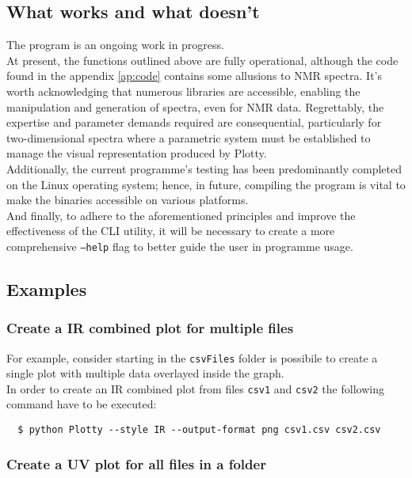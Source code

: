 \documentclass[../Master.tex]{subfiles}
\begin{document}
\subsection{What works and what doesn't}
The program is an ongoing work in progress.\\
At present, the functions outlined above are fully operational, although the code found in the appendix \ref{ap:code} contains some allusions to NMR spectra.
It's worth acknowledging that numerous libraries are accessible, enabling the manipulation and generation of spectra, even for NMR data. Regrettably, the expertise and parameter demands required are consequential, particularly for two-dimensional spectra where a parametric system must be established to manage the visual representation produced by Plotty.\\
Additionally, the current programme's testing has been predominantly completed on the Linux operating system; hence, in future, compiling the program is vital to make the binaries accessible on various platforms.\\
And finally, to adhere to the aforementioned principles and improve the effectiveness of the CLI utility, it will be necessary to create a more comprehensive \texttt{--help} flag to better guide the user in programme usage.

\subsection{Examples}

\subsubsection{Create a IR combined plot for multiple files}

For example, consider starting in the \texttt{csvFiles} folder is possibile to create a single plot with multiple data overlayed inside the graph.\\

In order to create an IR combined plot from files \texttt{csv1} and \texttt{csv2} the following command have to be executed:
\begin{lstlisting}
  $ python Plotty --style IR --output-format png csv1.csv csv2.csv 
\end{lstlisting}

\subsubsection{Create a UV plot for all files in a folder}
\end{document}
